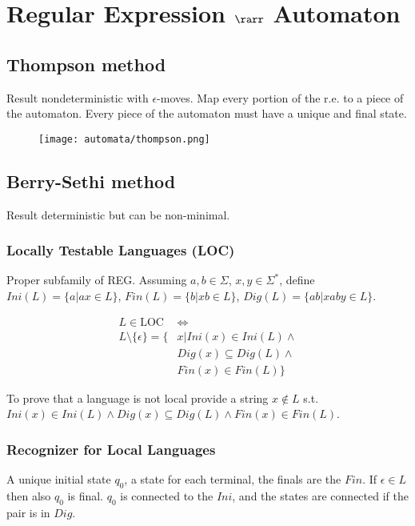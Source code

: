 \section{Regular Expression $\rarr$ Automaton}

\subsection{Thompson method}
Result nondeterministic with $\epsilon$-moves. Map every portion of the r.e. to a piece of the automaton. Every piece of the automaton must have a unique and final state.

\begin{figure}[H]
    \centering
    \texttt{[image: automata/thompson.png]}
\end{figure}

\subsection{Berry-Sethi method}

Result deterministic but can be non-minimal.

\subsubsection{Locally Testable Languages (LOC)}

Proper subfamily of REG. Assuming $a,b \in \Sigma$, $x, y \in \Sigma^*$, define $Ini(L) = \{a | ax \in L\}$, $Fin(L) = \{b | xb \in L\}$, $Dig(L) = \{ab | xaby \in L\}$.

\begin{align*}
    L \in \text{LOC} &\iff \\
    L \setminus \{\epsilon\} = \{&x | Ini(x) \in Ini(L) \land \\
    &Dig(x) \subseteq Dig(L) \land \\
    &Fin(x) \in Fin(L) \}
\end{align*}

To prove that a language is not local provide a string $x\notin L$ s.t. $Ini(x) \in Ini(L) \land Dig(x) \subseteq Dig(L) \land Fin(x) \in Fin(L)$.

\subsubsection{Recognizer for Local Languages}

A unique initial state $q_0$, a state for each terminal, the finals are the $Fin$. If $\epsilon \in L$ then also $q_0$ is final. $q_0$ is connected to the $Ini$, and the states are connected if the pair is in $Dig$.

